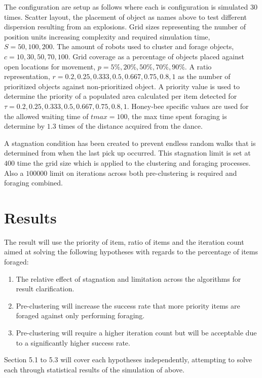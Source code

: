 \documentclass[12pt]{article}
\begin{document}
\par{The configuration are setup as follows where each is configuration is simulated 30 times. Scatter layout, the placement of object as names above to test different dispersion resulting from an explosions. Grid sizes representing the number of position units increasing complexity and required simulation time, $S = 50, 100, 200$. The amount of robots used to cluster and forage objects, $c = 10, 30, 50, 70, 100$. Grid coverage as a percentage of objects placed against open locations for movement, $p = 5\%, 20\%, 50\%, 70\%, 90\%$. A ratio representation, $r = 0.2, 0.25, 0.333, 0.5, 0.667, 0.75, 0.8, 1$ as the number of prioritized objects against non-prioritized object. A priority value is used to determine the priority of a populated area calculated per item detected for $\tau = 0.2, 0.25, 0.333, 0.5, 0.667, 0.75, 0.8, 1$. Honey-bee specific values are used for the allowed waiting time of $tmax = 100$, the max time spent foraging is determine by $1.3$ times of the distance acquired from the dance.}

\par{A stagnation condition has been created to prevent endless random walks that is determined from when the last pick up occurred. This stagnation limit is set at $400$ time the grid size which is applied to the clustering and foraging processes. Also a $100 000$ limit on iterations across both pre-clustering is required and foraging combined.}

\section{Results}

The result will use the priority of item, ratio of items and the iteration count aimed at solving the following hypotheses with regards to the percentage of items foraged: 
\begin{enumerate}[nolistsep]
	\item The relative effect of stagnation and limitation across the algorithms for result clarification.
	\item Pre-clustering will increase the success rate that more priority items are foraged against only performing foraging.
	\item Pre-clustering will require a higher iteration count but will be acceptable due to a significantly higher success rate.
\end{enumerate}
Section 5.1 to 5.3 will cover each hypotheses independently, attempting to solve each through statistical results of the simulation of above. 
\end{document}
